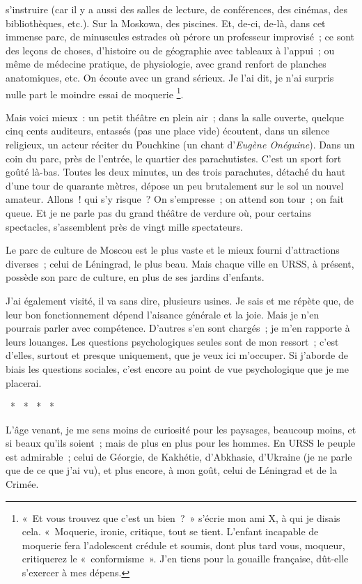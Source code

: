 \documentclass[french,twoside]{book} %
\begin{document}
s’instruire (car il y a aussi des salles de lecture, de conférences, des cinémas, des bibliothèques, etc.). Sur la Moskowa, des piscines. Et, de-ci, de-là, dans cet immense parc, de minuscules estrades où pérore un professeur improvisé ; ce sont des leçons de choses, d’histoire ou de géographie avec tableaux à l’appui ; ou même de médecine pratique, de physiologie, avec grand renfort de planches anatomiques, etc. On écoute avec un grand sérieux. Je l’ai dit, je n’ai surpris nulle part le moindre essai de moquerie \footnote{« Et vous trouvez que c’est un bien ? » s’écrie mon ami X, à qui je disais cela. « Moquerie, ironie, critique, tout se tient. L’enfant incapable de moquerie fera l’adolescent crédule et soumis, dont plus tard vous, moqueur, critiquerez le « conformisme ». J’en tiens pour la gouaille française, dût-elle s’exercer à mes dépens.}.\par
Mais voici mieux : un petit théâtre en plein air ; dans la salle ouverte, quelque cinq cents auditeurs, entassés (pas une place vide) écoutent, dans un silence religieux, un acteur réciter du Pouchkine (un chant d’\emph{Eugène Onéguine}). Dans un coin du parc, près de l’entrée, le quartier des parachutistes. C’est un sport fort goûté là-bas. Toutes les deux minutes, un des trois parachutes, détaché du haut d’une tour de quarante mètres, dépose un peu brutalement sur le sol un nouvel amateur. Allons ! qui s’y risque ? On s’empresse ; on attend son tour ; on fait queue. Et je ne parle pas du grand théâtre de verdure où, pour certains spectacles, s’assemblent près de vingt mille spectateurs.\par
Le parc de culture de Moscou est le plus vaste et le mieux fourni d’attractions diverses ; celui de Léningrad, le plus beau. Mais chaque ville en URSS, à présent, possède son parc de culture, en plus de ses jardins d’enfants.\par
J’ai également visité, il va sans dire, plusieurs usines. Je sais et me répète que, de leur bon fonctionnement dépend l’aisance générale et la joie. Mais je n’en pourrais parler avec compétence. D’autres s’en sont chargés ; je m’en rapporte à leurs louanges. Les questions psychologiques seules sont de mon ressort ; c’est d’elles, surtout et presque uniquement, que je veux ici m’occuper. Si j’aborde de biais les questions sociales, c’est encore au point de vue psychologique que je me placerai.\par
{\centering \noindent *  *  *  *  *\par}
\noindent L’âge venant, je me sens moins de curiosité pour les paysages, beaucoup moins, et si beaux qu’ils soient ; mais de plus en plus pour les hommes. En URSS le peuple est admirable ; celui de Géorgie, de Kakhétie, d’Abkhasie, d’Ukraine (je ne parle que de ce que j’ai vu), et plus encore, à mon goût, celui de Léningrad et de la Crimée.\par
\end{document}
